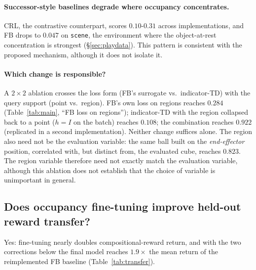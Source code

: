 \documentclass{article}
\begin{document}
\paragraph{Successor-style baselines degrade where occupancy concentrates.}
CRL, the contrastive counterpart, scores $0.10$-$0.31$ across implementations, and FB drops to $0.047$ on \texttt{scene}, the environment where the object-at-rest concentration is strongest (\S\ref{sec:playdata}).
This pattern is consistent with the proposed mechanism, although it does not isolate it.

\paragraph{Which change is responsible?}
A $2\times2$ ablation crosses the loss form (FB's surrogate vs.\ indicator-TD) with the query support (point vs.\ region).
FB's own loss on regions reaches $0.284$ (Table~\ref{tab:main}, ``FB loss on regions''); indicator-TD with the region collapsed back to a point ($h=I$ on the batch) reaches $0.108$; the combination reaches $0.922$ (replicated in a second implementation).
Neither change suffices alone.
The region also need not be the evaluation variable: the same ball built on the \emph{end-effector} position, correlated with, but distinct from, the evaluated cube, reaches $0.823$.
The region variable therefore need not exactly match the evaluation variable, although this ablation does not establish that the choice of variable is unimportant in general.

\subsection{Does occupancy fine-tuning improve held-out reward transfer?}
\label{sec:rq2}\label{sec:reward-transfer}

Yes: fine-tuning nearly doubles compositional-reward return, and with the two corrections below the final model reaches $1.9\times$ the mean return of the reimplemented FB baseline (Table~\ref{tab:transfer}).
\end{document}
